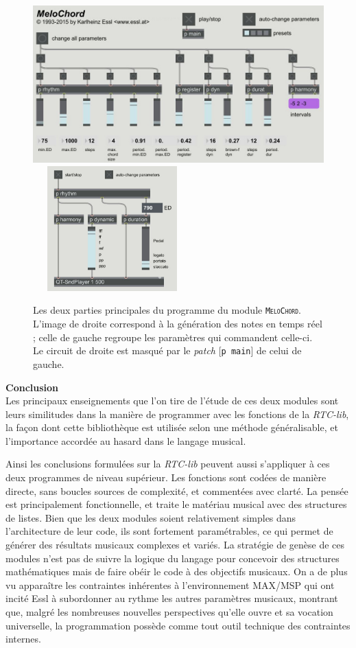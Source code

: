 \documentclass[a4paper,12pt]{article}
\newcommand{\module}[1]{\texttt{\textsc{#1}}}
\newcommand{\patch}[1]{[\texttt{#1}]}
\begin{document}
\begin{figure}[!h]
\begin{center}
\includegraphics[width=12cm]{images/melochord1.jpg}~~~\includegraphics[width=5cm]{images/melochord2.jpg}
\caption{\footnotesize Les deux parties principales du programme du module \module{MeloChord}. L'image de droite correspond à la génération des notes en temps réel ; celle de gauche regroupe les paramètres qui commandent celle-ci. Le circuit de droite est masqué par le \emph{patch} \patch{p main} de celui de gauche.}
\label{melochordmain}
\end{center}
\end{figure}


\textbf{Conclusion} \\
Les principaux enseignements que l'on tire de l'étude de ces deux modules sont leurs similitudes dans la manière de programmer avec les fonctions de la \emph{RTC-lib}, la façon dont cette bibliothèque est utilisée selon une méthode généralisable, et l'importance accordée au hasard dans le langage musical.

Ainsi les conclusions formulées sur la \emph{RTC-lib} peuvent aussi s'appliquer à ces deux programmes de niveau supérieur. Les fonctions sont codées de manière directe, sans boucles sources de complexité, et commentées avec clarté. La pensée est principalement fonctionnelle, et traite le matériau musical avec des structures de listes. Bien que les deux modules soient relativement simples dans l'architecture de leur code, ils sont fortement paramétrables, ce qui permet de générer des résultats musicaux complexes et variés. La stratégie de genèse de ces modules n'est pas de suivre la logique du langage pour concevoir des structures mathématiques mais de faire obéir le code à des objectifs musicaux. On a de plus vu apparaître les contraintes inhérentes à l'environnement MAX/MSP qui ont incité Essl à subordonner au rythme les autres paramètres musicaux, montrant que, malgré les nombreuses nouvelles perspectives qu'elle ouvre et sa vocation universelle, la programmation possède comme tout outil technique des contraintes internes.
\end{document}
